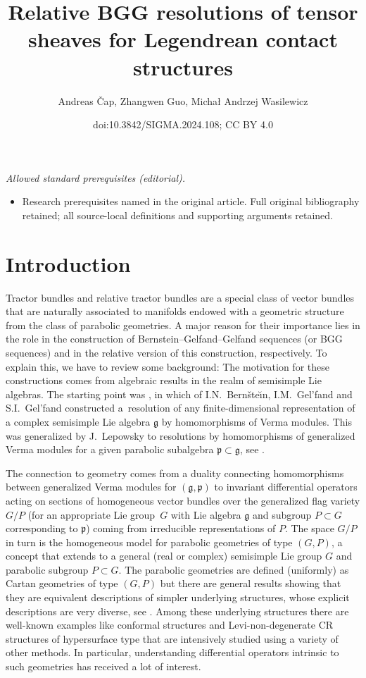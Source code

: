 \documentclass[10pt,a4paper]{amsart}
\title{Relative BGG resolutions of tensor sheaves for Legendrean contact structures}
\author{Andreas Čap, Zhangwen Guo, Michał Andrzej Wasilewicz}
\date{doi:10.3842/SIGMA.2024.108; CC BY 4.0}
\numberwithin{equation}{section}
\def\frak{\mathfrak}
\begin{document}
\maketitle
\noindent\textit{Allowed standard prerequisites (editorial).}\begin{itemize}
\item Research prerequisites named in the original article. Full original bibliography retained; all source-local definitions and supporting arguments retained.
\end{itemize}\medskip
\section{Introduction}\label{1}
Tractor bundles and relative tractor bundles are a special class of vector bundles
that are naturally associated to manifolds endowed with a geometric structure from
the class of parabolic geometries. A major reason for their importance lies in the
role in the construction of Bernstein--Gelfand--Gelfand sequences (or BGG sequences)
and in the relative version of this construction, respectively. To explain this, we
have to review some background: The motivation for these constructions comes from
algebraic results in the realm of semisimple Lie algebras. The starting point was
\cite{BGG}, in which of I.N.~Bern{\v{s}}te{\u\i}n, I.M.~Gel'fand and S.I.~Gel'fand constructed a~resolution of any finite-dimensional
representation of a complex semisimple Lie algebra $\frak g$ by homomorphisms of
Verma modules. This was generalized by J.~Lepowsky to resolutions by homomorphisms of
generalized Verma modules for a given parabolic subalgebra $\frak p\subset\frak g$,
see \cite{Lepowsky}.

The connection to geometry comes from a duality connecting homomorphisms between
generalized Verma modules for $(\frak g,\frak p)$ to invariant differential operators
acting on sections of homogeneous vector bundles over the generalized flag variety
$G/P$ (for an appropriate Lie group~$G$ with Lie algebra $\frak g$ and subgroup
$P\subset G$ corresponding to $\frak p$) coming from irreducible representations of
$P$. The space $G/P$ in turn is the homogeneous model for parabolic geometries of
type $(G,P)$, a concept that extends to a general (real or complex) semisimple Lie
group $G$ and parabolic subgroup $P\subset G$. The parabolic geometries are defined
(uniformly) as Cartan geometries of type $(G,P)$ but there are general results
showing that they are equivalent descriptions of simpler underlying structures,
whose explicit descriptions are very diverse, see \cite{book}. Among these underlying
structures there are well-known examples like conformal structures and
Levi-non-degenerate CR structures of hypersurface type that are intensively studied
using a variety of other methods. In particular, understanding differential operators
intrinsic to such geometries has received a lot of interest.
\end{document}
